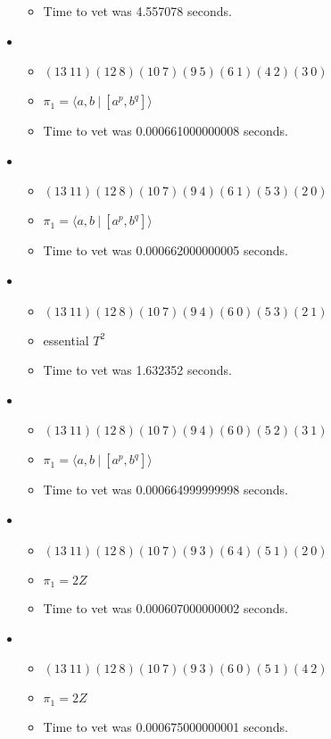 \documentclass{article}
\begin{document}
\begin{itemize}
\begin{itemize}
      \item Time to vet was 4.557078 seconds.
\end{itemize}
\item \begin{itemize}
      \item $(13\ 11)(12\ 8)(10\ 7)(9\ 5)(6\ 1)(4\ 2)(3\ 0)$
      \item $\pi_1 = \langle a,b\ |\ [a^p,b^q]\rangle$
      \item Time to vet was 0.000661000000008 seconds.
\end{itemize}
\item \begin{itemize}
      \item $(13\ 11)(12\ 8)(10\ 7)(9\ 4)(6\ 1)(5\ 3)(2\ 0)$
      \item $\pi_1 = \langle a,b\ |\ [a^p,b^q]\rangle$
      \item Time to vet was 0.000662000000005 seconds.
\end{itemize}
\item \begin{itemize}
      \item $(13\ 11)(12\ 8)(10\ 7)(9\ 4)(6\ 0)(5\ 3)(2\ 1)$
      \item essential $T^2$
      \item Time to vet was 1.632352 seconds.
\end{itemize}
\item \begin{itemize}
      \item $(13\ 11)(12\ 8)(10\ 7)(9\ 4)(6\ 0)(5\ 2)(3\ 1)$
      \item $\pi_1 = \langle a,b\ |\ [a^p,b^q]\rangle$
      \item Time to vet was 0.000664999999998 seconds.
\end{itemize}
\item \begin{itemize}
      \item $(13\ 11)(12\ 8)(10\ 7)(9\ 3)(6\ 4)(5\ 1)(2\ 0)$
      \item $\pi_1 =2 Z$
      \item Time to vet was 0.000607000000002 seconds.
\end{itemize}
\item \begin{itemize}
      \item $(13\ 11)(12\ 8)(10\ 7)(9\ 3)(6\ 0)(5\ 1)(4\ 2)$
      \item $\pi_1 =2 Z$
      \item Time to vet was 0.000675000000001 seconds.

\end{itemize}
\end{itemize}
\end{document}

